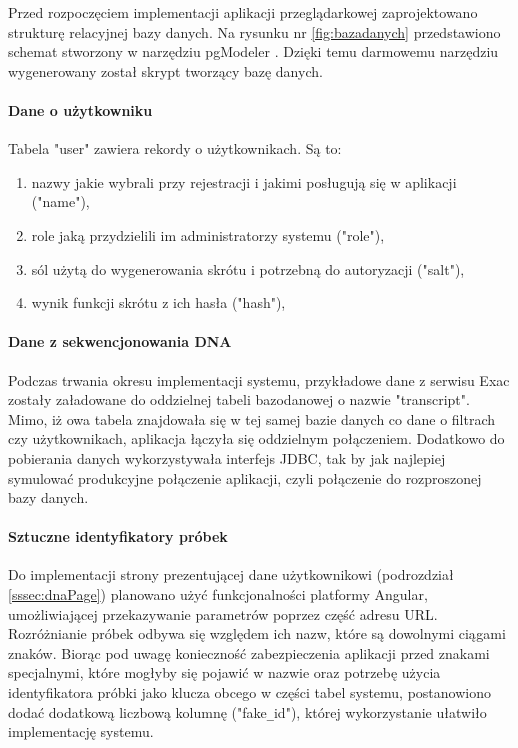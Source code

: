 \documentclass[a4paper,12pt,twoside]{article}
\begin{document}
\restoregeometry
\newpage

Przed rozpoczęciem implementacji aplikacji przeglądarkowej zaprojektowano strukturę 
relacyjnej bazy danych. Na rysunku nr \ref{fig:bazadanych} przedstawiono schemat stworzony
w narzędziu pgModeler \cite{pgModeler}. Dzięki temu darmowemu narzędziu wygenerowany został
skrypt tworzący bazę danych.  

\paragraph{Dane o użytkowniku} Tabela "user" zawiera rekordy o użytkownikach. 
Są to:
\begin{enumerate}[1)]
\item nazwy jakie wybrali przy rejestracji i jakimi posługują się w aplikacji ("name"),
\item role jaką przydzielili im administratorzy systemu ("role"),
\item sól użytą do wygenerowania skrótu i potrzebną do autoryzacji ("salt"),
\item wynik funkcji skrótu z ich hasła ("hash"),
\end{enumerate}

\paragraph{Dane z sekwencjonowania DNA} Podczas trwania okresu implementacji systemu,
przykładowe dane z serwisu Exac zostały załadowane do oddzielnej tabeli bazodanowej o nazwie "transcript". Mimo, iż owa tabela znajdowała się w tej samej bazie danych co 
dane o filtrach czy użytkownikach, aplikacja łączyła się oddzielnym połączeniem. 
Dodatkowo do pobierania danych wykorzystywała interfejs JDBC, tak by jak najlepiej
symulować produkcyjne połączenie aplikacji, czyli połączenie do rozproszonej bazy danych.

\paragraph{Sztuczne identyfikatory próbek} Do implementacji strony
prezentującej dane użytkownikowi (podrozdział \ref{sssec:dnaPage}) planowano użyć 
funkcjonalności platformy Angular, umożliwiającej przekazywanie parametrów 
poprzez część adresu URL. Rozróżnianie próbek odbywa się względem ich nazw, które
są dowolnymi ciągami znaków. Biorąc pod uwagę konieczność zabezpieczenia aplikacji przed 
znakami specjalnymi, które mogłyby się pojawić w nazwie oraz potrzebę
użycia identyfikatora próbki jako klucza obcego w części tabel systemu, postanowiono
dodać dodatkową liczbową kolumnę ("fake\verb!_!id"), której wykorzystanie ułatwiło implementację systemu.
\end{document}
